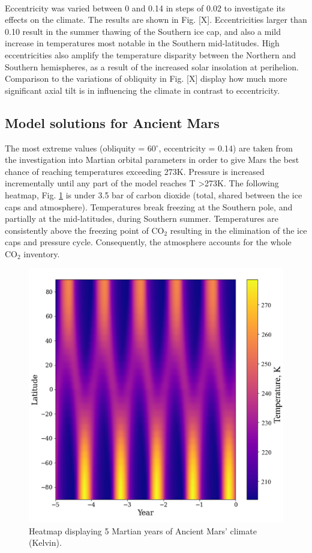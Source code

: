 \documentclass[12pt,onecolumn]{revtex4-2}    %
\begin{document}
\

Eccentricity was varied between 0 and 0.14 in steps of 0.02 to investigate its effects on the climate. The results are shown in Fig. [X]. Eccentricities larger than 0.10 result in the summer thawing of the Southern ice cap, and also a mild increase in temperatures most notable in the Southern mid-latitudes. High eccentricities also amplify the temperature disparity between the Northern and Southern hemispheres, as a result of the increased solar insolation at perihelion. Comparison to the variations of obliquity in Fig. [X] display how much more significant axial tilt is in influencing the climate in contrast to eccentricity.

\subsection{Model solutions for Ancient Mars}
The most extreme values (obliquity = 60$^{\circ}$, eccentricity = 0.14) are taken from the investigation into Martian orbital parameters in order to give Mars the best chance of reaching temperatures exceeding 273K. Pressure is increased incrementally until any part of the model reaches T \textgreater 273K. The following heatmap, Fig. \ref{fig:ancientmars} is under 3.5 bar of carbon dioxide (total, shared between the ice caps and atmosphere). Temperatures break freezing at the Southern pole, and partially at the mid-latitudes, during Southern summer. Temperatures are consistently above the freezing point of $\mathrm{CO_2}$ resulting in the elimination of the ice caps and pressure cycle. Consequently, the atmosphere accounts for the whole $\mathrm{CO_2}$ inventory.

\begin{figure}[h]
\centering
\includegraphics[width = 14cm]{ancient_mars_heatmap_new.png}
\caption{Heatmap displaying 5 Martian years of Ancient Mars' climate (Kelvin).}
\label{fig:ancientmars}
\end{figure}
\end{document}
